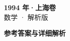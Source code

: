\documentclass[zihao=-4, a4paper]{ctexart}
\begin{document}
\begin{center}
  {\Large\bfseries 1994 年·上海卷}\\[4pt]
  {\large 数学 · 解析版}
\end{center}
\medskip
{}

\clearpage
{}
\begin{center}{\Large\bfseries 参考答案与详细解析}\end{center}
\medskip

\end{document}
